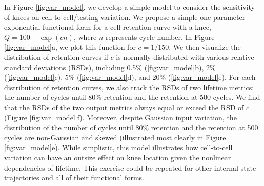 \documentclass[journal=jpclcd,manuscript=article]{achemso}
\begin{document}
In Figure \ref{fig:var_model}, we develop a simple model to consider the sensitivity of knees on cell-to-cell/testing variation. We propose a simple one-parameter exponential functional form for a cell retention curve with a knee, $Q=100 - \exp(cn)$, where $n$ represents cycle number. In Figure \ref{fig:var_model}a, we plot this function for $c=1/150$. We then visualize the distribution of retention curves if $c$ is normally distributed with various relative standard deviations (RSDs), including 0.5\% (\ref{fig:var_model}b), 2\% (\ref{fig:var_model}c), 5\% (\ref{fig:var_model}d), and 20\% (\ref{fig:var_model}e). For each distribution of retention curves, we also track the RSDs of two lifetime metrics: the number of cycles until 80\% retention and the retention at 500 cycles. We find that the RSDs of the two output metrics always equal or exceed the RSD of $c$ (Figure \ref{fig:var_model}f). Moreover, despite Gaussian input variation, the distribution of the number of cycles until 80\% retention and the retention at 500 cycles are non-Gaussian and skewed (illustrated most clearly in Figure \ref{fig:var_model}e). While simplistic, this model illustrates how cell-to-cell variation can have an outsize effect on knee location given the nonlinear dependencies of lifetime. This exercise could be repeated for other internal state trajectories and all of their functional forms.
\end{document}
